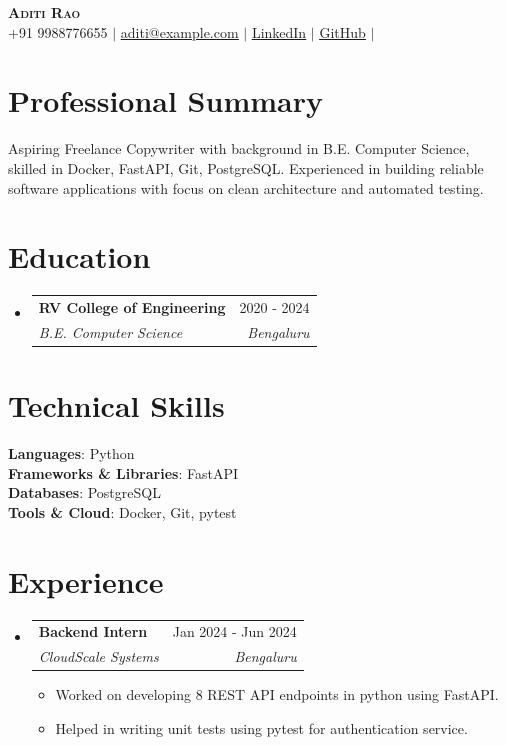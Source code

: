 \documentclass[letterpaper,10pt]{article}
\makeatletter
\newcommand{\resumeItem}[1]{
  \item\small{
    {#1 \vspace{-2pt}}
  }
}
\newcommand{\resumeSubheading}[4]{
  \vspace{-2pt}\item
    \begin{tabular*}{0.97\textwidth}[t]{l@{\extracolsep{\fill}}r}
      \textbf{#1} & #2 \\
      \textit{\small#3} & \textit{\small #4} \\
    \end{tabular*}\vspace{-7pt}
}
\newcommand{\resumeSubHeadingListStart}{\begin{itemize}[leftmargin=0.15in, label={}]}
\newcommand{\resumeSubHeadingListEnd}{\end{itemize}}
\newcommand{\resumeItemListStart}{\begin{itemize}}
\newcommand{\resumeItemListEnd}{\end{itemize}\vspace{-5pt}}
\makeatother
\begin{document}
\begin{center}
    \textbf{\Huge \scshape Aditi Rao} \\ \vspace{2pt}
    \small 
    +91 9988776655 $|$     \href{mailto:aditi@example.com}{\underline{aditi@example.com}} $|$     \href{https://linkedin.com/in/aditirao}{\underline{LinkedIn}} $|$     \href{https://github.com/aditirao}{\underline{GitHub}} $|$     \end{center}

\section{Professional Summary}
\small{Aspiring Freelance Copywriter with background in B.E. Computer Science, skilled in Docker, FastAPI, Git, PostgreSQL. Experienced in building reliable software applications with focus on clean architecture and automated testing.}
\vspace{2pt}

\section{Education}
  \resumeSubHeadingListStart
          \resumeSubheading
        {RV College of Engineering}{2020 - 2024}
        {B.E. Computer Science}{Bengaluru}
      \resumeSubHeadingListEnd

\section{Technical Skills}
 \begin{itemize}[leftmargin=0.15in, label={}]
    \small{\item{
                        \textbf{Languages}: Python \\
                                \textbf{Frameworks & Libraries}: FastAPI \\
                                \textbf{Databases}: PostgreSQL \\
                                \textbf{Tools & Cloud}: Docker, Git, pytest \\
                                }}
 \end{itemize}

\section{Experience}
  \resumeSubHeadingListStart
          \resumeSubheading
        {Backend Intern}{Jan 2024 - Jun 2024}
        {CloudScale Systems}{Bengaluru}
        \resumeItemListStart
                      \resumeItem{Worked on developing 8 REST API endpoints in python using FastAPI.}
                      \resumeItem{Helped in writing unit tests using pytest for authentication service.}
                  \resumeItemListEnd
      \resumeSubHeadingListEnd
\end{document}
